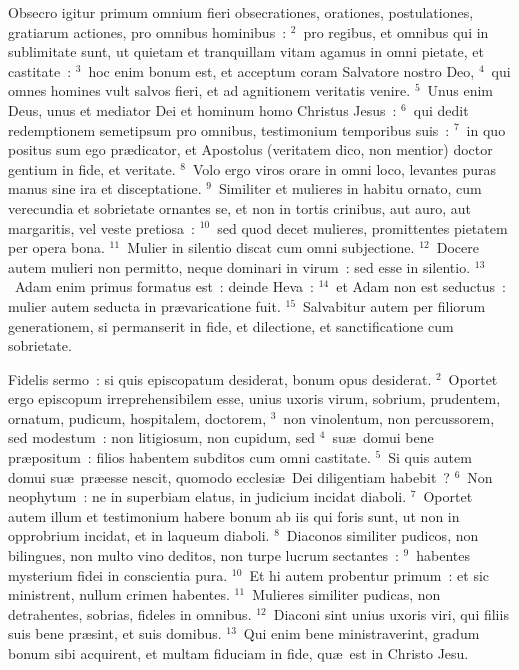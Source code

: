 \bchapter
\lettrine[lines=3,image=true,loversize=0.05,lraise=-0.03]{O}{}bsecro igitur primum omnium fieri obsecrationes, orationes, postulationes, gratiarum actiones, pro omnibus hominibus~:
${}^{2}$~pro regibus, et omnibus qui in sublimitate sunt, ut quietam et tranquillam vitam agamus in omni pietate, et castitate~:
${}^{3}$~hoc enim bonum est, et acceptum coram Salvatore nostro Deo,
${}^{4}$~qui omnes homines vult salvos fieri, et ad agnitionem veritatis venire.
${}^{5}$~Unus enim Deus, unus et mediator Dei et hominum homo Christus Jesus~:
${}^{6}$~qui dedit redemptionem semetipsum pro omnibus, testimonium temporibus suis~:
${}^{7}$~in quo positus sum ego pr\ae dicator, et Apostolus (veritatem dico, non mentior) doctor gentium in fide, et veritate.
${}^{8}$~Volo ergo viros orare in omni loco, levantes puras manus sine ira et disceptatione.
${}^{9}$~Similiter et mulieres in habitu ornato, cum verecundia et sobrietate ornantes se, et non in tortis crinibus, aut auro, aut margaritis, vel veste pretiosa~:
${}^{10}$~sed quod decet mulieres, promittentes pietatem per opera bona.
${}^{11}$~Mulier in silentio discat cum omni subjectione.
${}^{12}$~Docere autem mulieri non permitto, neque dominari in virum~: sed esse in silentio.
${}^{13}$~Adam enim primus formatus est~: deinde Heva~:
${}^{14}$~et Adam non est seductus~: mulier autem seducta in pr\ae varicatione fuit.
${}^{15}$~Salvabitur autem per filiorum generationem, si permanserit in fide, et dilectione, et sanctificatione cum sobrietate.

\bchapter
\lettrine[lines=3,image=true,loversize=0.05,lraise=-0.03]{F}{}idelis sermo~: si quis episcopatum desiderat, bonum opus desiderat.
${}^{2}$~Oportet ergo episcopum irreprehensibilem esse, unius uxoris virum, sobrium, prudentem, ornatum, pudicum, hospitalem, doctorem,
${}^{3}$~non vinolentum, non percussorem, sed modestum~: non litigiosum, non cupidum, sed
${}^{4}$~su\ae\ domui bene pr\ae positum~: filios habentem subditos cum omni castitate.
${}^{5}$~Si quis autem domui su\ae\ pr\ae esse nescit, quomodo ecclesi\ae\ Dei diligentiam habebit~?
${}^{6}$~Non neophytum~: ne in superbiam elatus, in judicium incidat diaboli.
${}^{7}$~Oportet autem illum et testimonium habere bonum ab iis qui foris sunt, ut non in opprobrium incidat, et in laqueum diaboli.
${}^{8}$~Diaconos similiter pudicos, non bilingues, non multo vino deditos, non turpe lucrum sectantes~:
${}^{9}$~habentes mysterium fidei in conscientia pura.
${}^{10}$~Et hi autem probentur primum~: et sic ministrent, nullum crimen habentes.
${}^{11}$~Mulieres similiter pudicas, non detrahentes, sobrias, fideles in omnibus.
${}^{12}$~Diaconi sint unius uxoris viri, qui filiis suis bene pr\ae sint, et suis domibus.
${}^{13}$~Qui enim bene ministraverint, gradum bonum sibi acquirent, et multam fiduciam in fide, qu\ae\ est in Christo Jesu.


